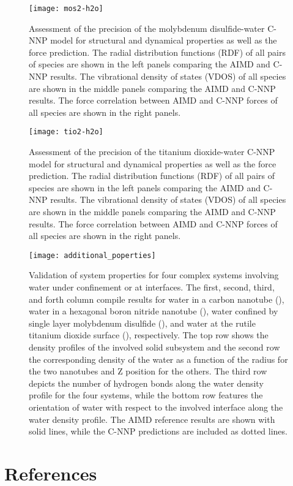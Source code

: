 \documentclass[aip,jcp,amsmath,amssymb,floatfix,reprint,citeautoscript,noeprint]{revtex4-1}
\begin{document}
\begin{bibunit}
\begin{figure}
\centering
\texttt{[image: mos2-h2o]}
\caption{\label{fig:score-mos2-h2o}
%
Assessment of the precision of the molybdenum disulfide-water C-NNP model
for structural and dynamical properties as well as the force prediction.
%
The radial distribution functions (RDF) of all pairs of species
are shown in the left panels comparing the AIMD and C-NNP results.
%
The vibrational density of states (VDOS) of all species
are shown in the middle panels comparing the AIMD and C-NNP results.
%
The force correlation between AIMD and C-NNP forces of all species
are shown in the right panels.
%
}
\end{figure}

\begin{figure}
\centering
\texttt{[image: tio2-h2o]}
\caption{\label{fig:score-tio2-h2o}
%
Assessment of the precision of the titanium dioxide-water C-NNP model
for structural and dynamical properties as well as the force prediction.
%
The radial distribution functions (RDF) of all pairs of species
are shown in the left panels comparing the AIMD and C-NNP results.
%
The vibrational density of states (VDOS) of all species
are shown in the middle panels comparing the AIMD and C-NNP results.
%
The force correlation between AIMD and C-NNP forces of all species
are shown in the right panels.
%
}
\end{figure}

\begin{figure}
\centering
\texttt{[image: additional\_poperties]}
\caption{\label{fig:other-prop}
%
Validation of system properties for four complex systems involving water under confinement or at interfaces.
%
The first, second, third, and forth column compile results for water in a carbon nanotube (), water in a hexagonal boron nitride nanotube (), water confined by single layer molybdenum disulfide (), and water at the rutile titanium dioxide surface (), respectively.
%
The top row shows the density profiles of the involved solid subsystem and the second row the corresponding density of the water as a function of the radius for the two nanotubes and Z position for the others.
%
The third row depicts the number of hydrogen bonds along the water density profile
for the four systems, while the bottom row features the orientation of water with respect to the involved interface along the water density profile.
%
The AIMD reference results are shown with solid lines, while the C-NNP predictions are included as dotted lines.
}
\end{figure}

%
%
\FloatBarrier

\section*{References}



\end{bibunit}
\end{document}
